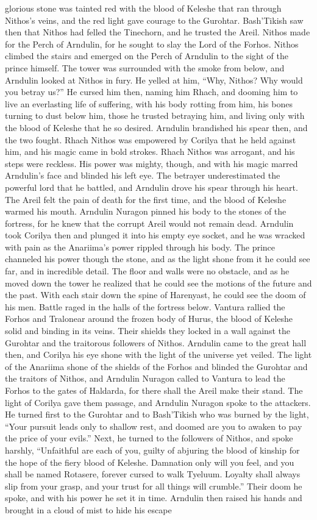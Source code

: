 \documentclass[smalldemyvopaper,11pt,twoside,onecolumn,openright,extrafontsizes]{memoir}
\begin{document}
glorious stone was tainted red with the blood of Keleshe that ran through Nithos’s veins, and the red light gave courage to the Gurohtar. Bash’Tikish saw then that Nithos had felled the Tinechorn, and he trusted the Areil. Nithos made for the Perch of Arndulin, for he sought to slay the Lord of the Forhos. Nithos climbed the stairs and emerged on the Perch of Arndulin to the sight of the prince himself. The tower was surrounded with the smoke from below, and Arndulin looked at Nithos in fury. He yelled at him, “Why, Nithos? Why would you betray us?” He cursed him then, naming him Rhach, and dooming him to live an everlasting life of suffering, with his body rotting from him, his bones turning to dust below him, those he trusted betraying him, and living only with the blood of Keleshe that he so desired. Arndulin brandished his spear then, and the two fought. Rhach Nithos was empowered by Corilya that he held against him, and his magic came in bold strokes. Rhach Nithos was arrogant, and his steps were reckless. His power was mighty, though, and with his magic marred Arndulin’s face and blinded his left eye. The betrayer underestimated the powerful lord that he battled, and Arndulin drove his spear through his heart. The Areil felt the pain of death for the first time, and the blood of Keleshe warmed his mouth. Arndulin Nuragon pinned his body to the stones of the fortress, for he knew that the corrupt Areil would not remain dead. Arndulin took Corilya then and plunged it into his empty eye socket, and he was wracked with pain as the Anariima’s power rippled through his body. The prince channeled his power though the stone, and as the light shone from it he could see far, and in incredible detail. The floor and walls were no obstacle, and as he moved down the tower he realized that he could see the motions of the future and the past. With each stair down the spine of Harenyast, he could see the doom of his men. Battle raged in the halls of the fortress below. Vantura rallied the Forhos and Tralonear around the frozen body of Hurus, the blood of Keleshe solid and binding in its veins. Their shields they locked in a wall against the Gurohtar and the traitorous followers of Nithos. Arndulin came to the great hall then, and Corilya his eye shone with the light of the universe yet veiled. The light of the Anariima shone of the shields of the Forhos and blinded the Gurohtar and the traitors of Nithos, and Arndulin Nuragon called to Vantura to lead the Forhos to the gates of Haldarda, for there shall the Areil make their stand. The light of Corilya gave them passage, and Arndulin Nuragon spoke to the attackers. He turned first to the Gurohtar and to Bash’Tikish who was burned by the light, “Your pursuit leads only to shallow rest, and doomed are you to awaken to pay the price of your evils.” Next, he turned to the followers of Nithos, and spoke harshly, “Unfaithful are each of you, guilty of abjuring the blood of kinship for the hope of the fiery blood of Keleshe. Damnation only will you feel, and you shall be named Rotasere, forever cursed to walk Tyeluum. Loyalty shall always slip from your grasp, and your trust for all things will crumble.” Their doom he spoke, and with his power he set it in time. Arndulin then raised his hands and brought in a cloud of mist to hide his escape 
\end{document}
